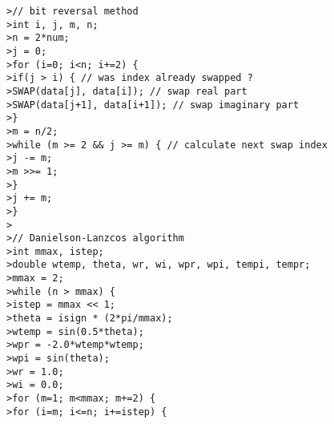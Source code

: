 \texttt{>\quad // bit reversal method} \\
\texttt{>\quad int i, j, m, n;} \\
\texttt{>\quad n = 2*num;} \\
\texttt{>\quad j = 0;} \\
\texttt{>\quad for (i=0; i<n; i+=2) \{} \\
\texttt{>\quad \qquad if(j > i) \{   // was index already swapped ?} \\
\texttt{>\quad \qquad\qquad SWAP(data[j], data[i]);   // swap real part} \\
\texttt{>\quad \qquad\qquad SWAP(data[j+1], data[i+1]);   // swap imaginary part} \\
\texttt{>\quad \qquad \}} \\
\texttt{>\quad \qquad m = n/2;} \\
\texttt{>\quad \qquad while (m >= 2 \&\& j >= m) \{  // calculate next swap index} \\
\texttt{>\quad \qquad\qquad j -= m;} \\
\texttt{>\quad \qquad\qquad m >>= 1;} \\
\texttt{>\quad \qquad \}} \\
\texttt{>\quad \qquad j += m;} \\
\texttt{>\quad \}} \\
\texttt{>\quad } \\
\texttt{>\quad // Danielson-Lanzcos algorithm} \\
\texttt{>\quad int mmax, istep;} \\
\texttt{>\quad double wtemp, theta, wr, wi, wpr, wpi, tempi, tempr;} \\
\texttt{>\quad mmax = 2;} \\
\texttt{>\quad while (n > mmax) \{} \\
\texttt{>\quad \qquad istep = mmax << 1;} \\
\texttt{>\quad \qquad theta = isign * (2*pi/mmax);} \\
\texttt{>\quad \qquad wtemp = sin(0.5*theta);} \\
\texttt{>\quad \qquad wpr = -2.0*wtemp*wtemp;} \\
\texttt{>\quad \qquad wpi = sin(theta);} \\
\texttt{>\quad \qquad wr = 1.0;} \\
\texttt{>\quad \qquad wi = 0.0;} \\
\texttt{>\quad \qquad for (m=1; m<mmax; m+=2) \{} \\
\texttt{>\quad \qquad\qquad for (i=m; i<=n; i+=istep) \{} \\

